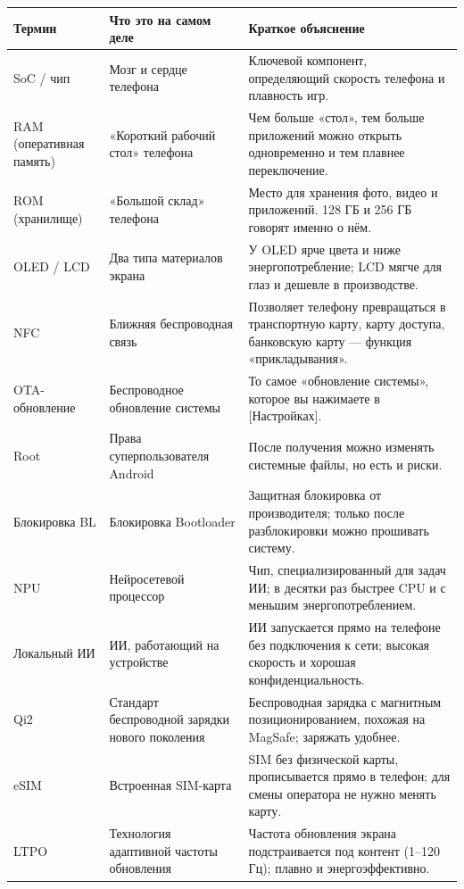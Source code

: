 
\begin{center}
\begin{tabularx}{\linewidth}{|X|X|X|}
\hline
\textbf{Термин} & \textbf{Что это на самом деле} & \textbf{Краткое объяснение} \tabularnewline
\hline
SoC / чип & Мозг и сердце телефона & Ключевой компонент, определяющий скорость телефона и плавность игр. \tabularnewline
RAM (оперативная память) & «Короткий рабочий стол» телефона & Чем больше «стол», тем больше приложений можно открыть одновременно и тем плавнее переключение. \tabularnewline
ROM (хранилище) & «Большой склад» телефона & Место для хранения фото, видео и приложений. 128 ГБ и 256 ГБ говорят именно о нём. \tabularnewline
OLED / LCD & Два типа материалов экрана & У OLED ярче цвета и ниже энергопотребление; LCD мягче для глаз и дешевле в производстве. \tabularnewline
NFC & Ближняя беспроводная связь & Позволяет телефону превращаться в транспортную карту, карту доступа, банковскую карту — функция «прикладывания». \tabularnewline
OTA-обновление & Беспроводное обновление системы & То самое «обновление системы», которое вы нажимаете в [Настройках]. \tabularnewline
Root & Права суперпользователя Android & После получения можно изменять системные файлы, но есть и риски. \tabularnewline
Блокировка BL & Блокировка Bootloader & Защитная блокировка от производителя; только после разблокировки можно прошивать систему. \tabularnewline
NPU & Нейросетевой процессор & Чип, специализированный для задач ИИ; в десятки раз быстрее CPU и с меньшим энергопотреблением. \tabularnewline
Локальный ИИ & ИИ, работающий на устройстве & ИИ запускается прямо на телефоне без подключения к сети; высокая скорость и хорошая конфиденциальность. \tabularnewline
Qi2 & Стандарт беспроводной зарядки нового поколения & Беспроводная зарядка с магнитным позиционированием, похожая на MagSafe; заряжать удобнее. \tabularnewline
eSIM & Встроенная SIM-карта & SIM без физической карты, прописывается прямо в телефон; для смены оператора не нужно менять карту. \tabularnewline
LTPO & Технология адаптивной частоты обновления & Частота обновления экрана подстраивается под контент (1–120 Гц); плавно и энергоэффективно. \tabularnewline
\hline
\end{tabularx}
\end{center}

